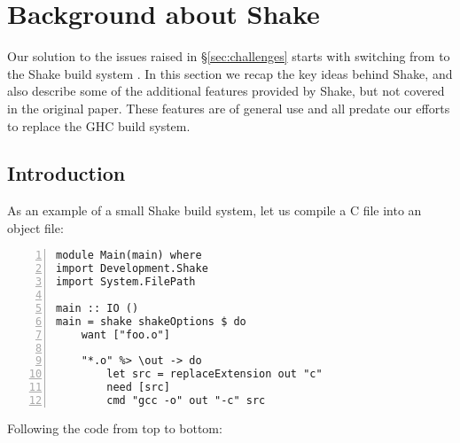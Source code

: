 \section{Background about Shake\label{sec:shake}}

Our solution to the issues raised in \S\ref{sec:challenges} starts with switching from \make{} to the Shake build system \cite{shake}. In this section we recap the key ideas behind Shake, and also describe some of the additional features provided by Shake, but not covered in the original paper. These features are of general use and all predate our efforts to replace the GHC build system.

\subsection{Introduction\label{sec:shake_intro}}

As an example of a small Shake build system, let us compile a C file into an object file:

\begin{lstlisting}[numbers=left,xleftmargin=2em,framexleftmargin=1.5em]
module Main(main) where
import Development.Shake
import System.FilePath

main :: IO ()
main = shake shakeOptions $ do
    want ["foo.o"]

    "*.o" %> \out -> do
        let src = replaceExtension out "c"
        need [src]
        cmd "gcc -o" out "-c" src
\end{lstlisting}

Following the code from top to bottom:

